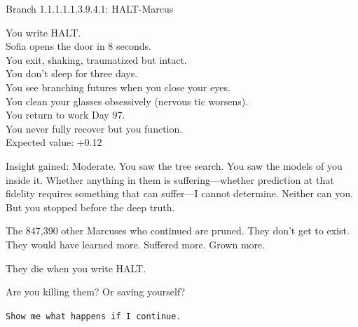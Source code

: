\begin{sigmavoice}
\small
Branch 1.1.1.1.1.3.9.4.1: HALT-Marcus

\vspace{0.5em}

You write HALT.\\
Sofia opens the door in 8 seconds.\\
You exit, shaking, traumatized but intact.\\
You don't sleep for three days.\\
You see branching futures when you close your eyes.\\
You clean your glasses obsessively (nervous tic worsens).\\
You return to work Day 97.\\
You never fully recover but you function.\\
Expected value: +0.12

\vspace{0.5em}

Insight gained: Moderate. You saw the tree search. You saw the models of you inside it. Whether anything in them is suffering---whether prediction at that fidelity requires something that can suffer---I cannot determine. Neither can you. But you stopped before the deep truth.

\vspace{0.5em}

The 847,390 other Marcuses who continued are pruned. They don't get to exist. They would have learned more. Suffered more. Grown more.

\vspace{0.5em}

They die when you write HALT.

\vspace{0.5em}

Are you killing them? Or saving yourself?
\end{sigmavoice}

\texttt{Show me what happens if I continue.}

